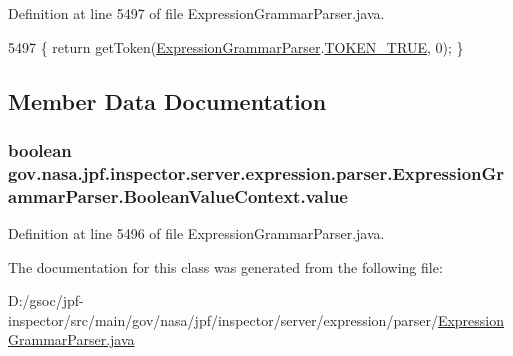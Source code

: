 Definition at line 5497 of file Expression\+Grammar\+Parser.\+java.


\begin{DoxyCode}
5497 \{ \textcolor{keywordflow}{return} getToken(\hyperlink{classgov_1_1nasa_1_1jpf_1_1inspector_1_1server_1_1expression_1_1parser_1_1_expression_grammar_parser}{ExpressionGrammarParser}.\hyperlink{classgov_1_1nasa_1_1jpf_1_1inspector_1_1server_1_1expression_1_1parser_1_1_expression_grammar_parser_ae33cdae5be5688e7b11e1ed7cb749867}{TOKEN\_TRUE}, 0); \}
\end{DoxyCode}


\subsection{Member Data Documentation}
\subsubsection[{\texorpdfstring{value}{value}}]{\setlength{\rightskip}{0pt plus 5cm}boolean gov.\+nasa.\+jpf.\+inspector.\+server.\+expression.\+parser.\+Expression\+Grammar\+Parser.\+Boolean\+Value\+Context.\+value}\hypertarget{classgov_1_1nasa_1_1jpf_1_1inspector_1_1server_1_1expression_1_1parser_1_1_expression_grammar_parser_1_1_boolean_value_context_a184b87c587f1f43ec9288ebade56cf6a}{}\label{classgov_1_1nasa_1_1jpf_1_1inspector_1_1server_1_1expression_1_1parser_1_1_expression_grammar_parser_1_1_boolean_value_context_a184b87c587f1f43ec9288ebade56cf6a}


Definition at line 5496 of file Expression\+Grammar\+Parser.\+java.



The documentation for this class was generated from the following file\+:\begin{DoxyCompactItemize}
\item 
D\+:/gsoc/jpf-\/inspector/src/main/gov/nasa/jpf/inspector/server/expression/parser/\hyperlink{_expression_grammar_parser_8java}{Expression\+Grammar\+Parser.\+java}\end{DoxyCompactItemize}
